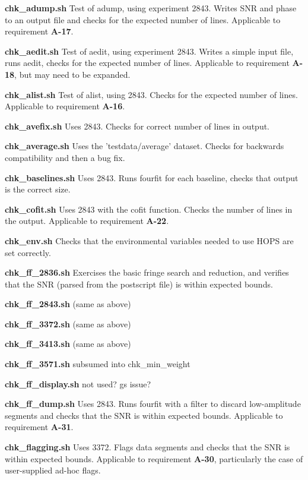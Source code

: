 \begin{description}

\item{\textbf{chk\_adump.sh}} Test of adump, using experiment 2843. Writes SNR and phase to an output file and checks for the expected number of lines. Applicable to requirement \textbf{A-17}.
\item{\textbf{chk\_aedit.sh}} Test of aedit, using experiment 2843. Writes a simple input file, runs aedit, checks for the expected number of lines. Applicable to requirement \textbf{A-18}, but may need to be expanded.
\item{\textbf{chk\_alist.sh}} Test of alist, using 2843. Checks for the expected number of lines. Applicable to requirement \textbf{A-16}.
\item{\textbf{chk\_avefix.sh}} Uses 2843. Checks for correct number of lines in output.
\item{\textbf{chk\_average.sh}} Uses the 'testdata/average' dataset. Checks for backwards compatibility and then a bug fix. %
\item{\textbf{chk\_baselines.sh}} Uses 2843. Runs fourfit for each baseline, checks that output is the correct size.
\item{\textbf{chk\_cofit.sh}} Uses 2843 with the cofit function. Checks the number of lines in the output. Applicable to requirement \textbf{A-22}.
\item{\textbf{chk\_env.sh}} Checks that the environmental variables needed to use HOPS are set correctly.
\item{\textbf{chk\_ff\_2836.sh}} Exercises the basic fringe search and reduction, and verifies that the SNR (parsed from the postscript file) is within expected bounds.
\item{\textbf{chk\_ff\_2843.sh}} (same as above)
\item{\textbf{chk\_ff\_3372.sh}} (same as above)
\item{\textbf{chk\_ff\_3413.sh}} (same as above)
\item{\textbf{chk\_ff\_3571.sh}} subsumed into chk\_min\_weight
\item{\textbf{chk\_ff\_display.sh}} not used? gs issue?
\item{\textbf{chk\_ff\_dump.sh}} Uses 2843. Runs fourfit with a filter to discard low-amplitude segments and checks that the SNR is within expected bounds. Applicable to requirement \textbf{A-31}.
\item{\textbf{chk\_flagging.sh}} Uses 3372. Flags data segments and checks that the SNR is within expected bounds. Applicable to requirement \textbf{A-30}, particularly the case of user-supplied ad-hoc flags.

\end{description}
